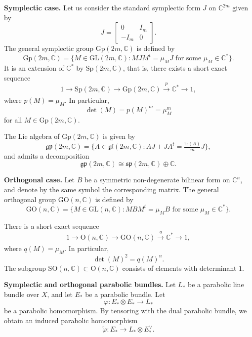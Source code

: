 \documentclass[11pt, reqno]{amsart}
\numberwithin{equation}{section}
\theoremstyle{definition}
\begin{document}
\medskip

\noindent\textbf{Symplectic case.}
Let us consider the standard symplectic form $J$ on $\mathbb{C}^{2m}$ given by
\[
J = \begin{bmatrix} 0 & I_{m} \\ -I_{m} & 0 \end{bmatrix}.
\]
The general symplectic group $\mathrm{Gp}(2m,\mathbb{C})$ is defined by
\[
\mathrm{Gp}(2m,\mathbb{C}) = \{ M \in \mathrm{GL}(2m,\mathbb{C}) : MJM^t=\mu_M J \text{ for some } \mu_M \in \mathbb{C}^*\}.
\]
It is an extension of $\mathbb{C}^*$ by $\mathrm{Sp}(2m,\mathbb{C})$, that is, there exists a short exact sequence
\[
1 \to \mathrm{Sp}(2m,\mathbb{C}) \longrightarrow \mathrm{Gp}(2m,\mathbb{C}) \xrightarrow[]{p} \mathbb{C}^* \to 1,
\]
where $p(M)=\mu_M$. In particular,
\[
\det(M)=p(M)^m=\mu_M^m
\]
for all $M \in \mathrm{Gp}(2m,\mathbb{C})$.

The Lie algebra of $\mathrm{Gp}(2m,\mathbb{C})$ is given by
\[
\mathfrak{gp}(2m,\mathbb{C}) = \{A \in \mathfrak{gl}(2m,\mathbb{C}) : AJ + JA^t = \tfrac{\mathrm{tr}(A)}{m}J\},
\]
and admits a decomposition
\[
\mathfrak{gp}(2m,\mathbb{C}) \cong \mathfrak{sp}(2m,\mathbb{C}) \oplus \mathbb{C}.
\]

\medskip

\noindent\textbf{Orthogonal case.}
Let $B$ be a symmetric non-degenerate bilinear form on $\mathbb{C}^{n}$, and denote by the same symbol the corresponding matrix. The general orthogonal group $\mathrm{GO}(n,\mathbb{C})$ is defined by
\begin{equation}\label{eqn1}
\mathrm{GO}(n,\mathbb{C}) = \{ M \in \mathrm{GL}(n,\mathbb{C}) : MBM^t=\mu_M B \text{ for some } \mu_M \in \mathbb{C}^*\}.
\end{equation}

There is a short exact sequence
\[
1 \to \mathrm{O}(n,\mathbb{C}) \longrightarrow \mathrm{GO}(n,\mathbb{C}) \xrightarrow[]{q} \mathbb{C}^* \to 1,
\]
where $q(M)=\mu_M$. In particular,
\[
\det(M)^2=q(M)^n.
\]
The subgroup $\mathrm{SO}(n,\mathbb{C}) \subset \mathrm{O}(n,\mathbb{C})$ consists of elements with determinant $1$.

\medskip

\noindent\textbf{Symplectic and orthogonal parabolic bundles.}
Let $L_*$ be a parabolic line bundle over $X$, and let $E_*$ be a parabolic bundle. Let
\[
\varphi : E_* \otimes E_* \longrightarrow L_*
\]
be a parabolic homomorphism. By tensoring with the dual parabolic bundle, we obtain an induced parabolic homomorphism
\begin{equation}\label{nondegenerate}
\tilde{\varphi} : E_* \longrightarrow L_* \otimes E^\vee_*.
\end{equation}
\end{document}

